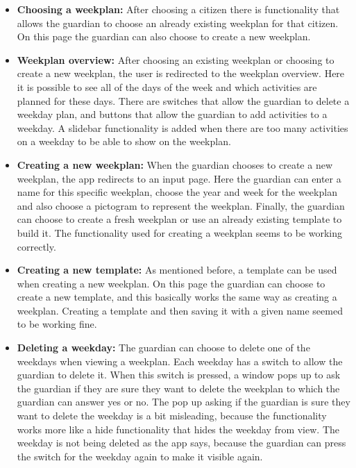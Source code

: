 \begin{itemize}
    \item \textbf{Choosing a weekplan:} After choosing a citizen there is functionality that allows the guardian to choose an already existing weekplan for that citizen.
    On this page the guardian can also choose to create a new weekplan.
    \\
    \item \textbf{Weekplan overview:} After choosing an existing weekplan or choosing to create a new weekplan, the user is redirected to the weekplan overview.
    Here it is possible to see all of the days of the week and which activities are planned for these days.
    There are switches that allow the guardian to delete a weekday plan, and buttons that allow the guardian to add activities to a weekday.
    A slidebar functionality is added when there are too many activities on a weekday to be able to show on the weekplan.
    \\
    \item \textbf{Creating a new weekplan:} When the guardian chooses to create a new weekplan, the app redirects to an input page.
    Here the guardian can enter a name for this specific weekplan, choose the year and week for the weekplan and also choose a pictogram to represent the weekplan.
    Finally, the guardian can choose to create a fresh weekplan or use an already existing template to build it. The functionality used for creating a weekplan seems to be working correctly.
    \\
    \item \textbf{Creating a new template:} As mentioned before, a template can be used when creating a new weekplan.
    On this page the guardian can choose to create a new template, and this basically works the same way as creating a weekplan.
    Creating a template and then saving it with a given name seemed to be working fine.
    \\
    \item \textbf{Deleting a weekday:} The guardian can choose to delete one of the weekdays when viewing a weekplan. 
    Each weekday has a switch to allow the guardian to delete it.
    When this switch is pressed, a window pops up to ask the guardian if they are sure they want to delete the weekplan to which the guardian can answer yes or no.
    The pop up asking if the guardian is sure they want to delete the weekday is a bit misleading, because the functionality works more like a hide functionality that hides the weekday from view.
    The weekday is not being deleted as the app says, because the guardian can press the switch for the weekday again to make it visible again.

\end{itemize}
